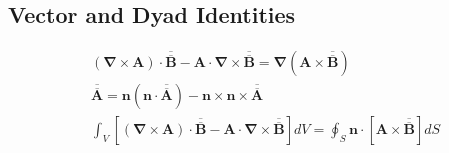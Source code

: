\subsection{Vector and Dyad Identities}
\begin{align}
& \left( \boldsymbol{\nabla} \times \boldsymbol{A} \right) \cdot \overline{\overline{\boldsymbol{B}}} - \boldsymbol{A} \cdot \boldsymbol{\nabla} \times \overline{\overline{\boldsymbol{B}}} = \boldsymbol{\nabla} \left( \boldsymbol{A} \times \overline{\overline{\boldsymbol{B}}} \right)
\\
& \overline{\overline{\boldsymbol{A}}} = \boldsymbol{n} \left( \boldsymbol{n} \cdot \overline{\overline{\boldsymbol{A}}} \right) - \boldsymbol{n} \times \boldsymbol{n} \times \overline{\overline{\boldsymbol{A}}}
\\
& \int_{V} \left[ \left( \boldsymbol{\nabla} \times \boldsymbol{A} \right) \cdot \overline{\overline{\boldsymbol{B}}} - \boldsymbol{A} \cdot \boldsymbol{\nabla} \times \overline{\overline{\boldsymbol{B}}} \right] dV = \oint_{S} \boldsymbol{n} \cdot \left[ \boldsymbol{A} \times \overline{\overline{\boldsymbol{B}}} \right] dS
\end{align}



